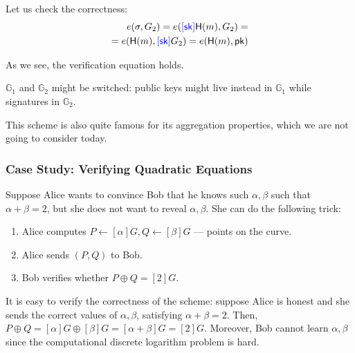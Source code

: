 \documentclass[../lecture-notes.tex]{subfiles}
\begin{document}
Let us check the correctness:
\begin{equation*}
    \begin{aligned}
        e(\sigma,G_2) = e(\textcolor{blue}{[\mathsf{sk}]}\mathsf{H}(m),G_2) = \\
        = e(\mathsf{H}(m), \textcolor{blue}{[\mathsf{sk}]}G_2) = e(\mathsf{H}(m), \mathsf{pk})        
    \end{aligned}
\end{equation*}

As we see, the verification equation holds. 
    
\begin{remark}
    $\mathbb{G}_1$ and $\mathbb{G}_2$ might be switched: public keys might live instead in $\mathbb{G}_1$ while signatures in $\mathbb{G}_2$.        
\end{remark}

This scheme is also quite famous for its aggregation properties, which we are not going to consider today.

\subsubsection{Case Study: Verifying Quadratic Equations}

\begin{example}
    Suppose Alice wants to convince Bob that he knows such $\alpha,\beta$ such that $\alpha + \beta = 2$, but she does not want to reveal $\alpha,\beta$. She can do the following trick:
    \begin{enumerate}
        \item Alice computes $P \gets [\alpha]G, Q \gets [\beta]G$ --- points on the curve.
        \item Alice sends $(P,Q)$ to Bob.
        \item Bob verifies whether $P\oplus Q = [2]G$.
    \end{enumerate}
    
    It is easy to verify the correctness of the scheme: suppose Alice is honest and she sends the correct values of $\alpha,\beta$, satisfying $\alpha+\beta=2$. Then, $P\oplus Q = [\alpha]G \oplus [\beta]G = [\alpha+\beta]G = [2]G$. Moreover, Bob cannot learn $\alpha,\beta$ since the computational discrete logarithm problem is hard.        
\end{example}
\end{document}
